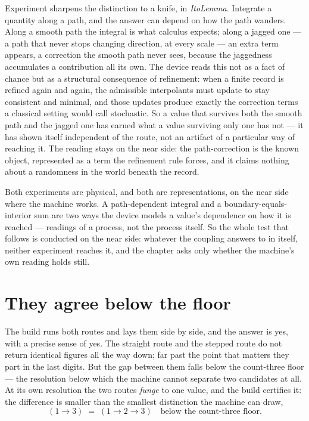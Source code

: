 Experiment sharpens the distinction to a knife, in \emph{ItoLemma}.
Integrate a quantity along a path, and the answer can depend on how the path wanders.
Along a smooth path the integral is what calculus expects; along a jagged one --- a path that never stops changing
direction, at every scale --- an extra term appears, a correction the smooth path never sees, because the jaggedness
accumulates a contribution all its own.
The device reads this not as a fact of chance but as a structural consequence of refinement: when a finite record is
refined again and again, the admissible interpolants must update to stay consistent and minimal, and those updates
produce exactly the correction terms a classical setting would call stochastic.
So a value that survives both the smooth path and the jagged one has earned what a value surviving only one has not --- it
has shown itself independent of the route, not an artifact of a particular way of reaching it.
The reading stays on the near side: the path-correction is the known object, represented as a term the refinement rule
forces, and it claims nothing about a randomness in the world beneath the record.

Both experiments are physical, and both are representations, on the near side where the machine works.
A path-dependent integral and a boundary-equals-interior sum are two ways the device models a value's dependence on how
it is reached --- readings of a process, not the process itself.
So the whole test that follows is conducted on the near side: whatever the coupling answers to in itself, neither
experiment reaches it, and the chapter asks only whether the machine's own reading holds still.

\section{They agree below the floor}

The build runs both routes and lays them side by side, and the answer is yes, with a precise sense of yes.
The straight route and the stepped route do not return identical figures all the way down; far past the point that
matters they part in the last digits.
But the gap between them falls below the count-three floor --- the resolution below which the machine cannot separate
two candidates at all.
At its own resolution the two routes \emph{funge} to one value, and the build certifies it: the difference is smaller than the
smallest distinction the machine can draw,
\[
  (1 \to 3) \;=\; (1 \to 2 \to 3) \quad\text{below the count-three floor} .
\]

